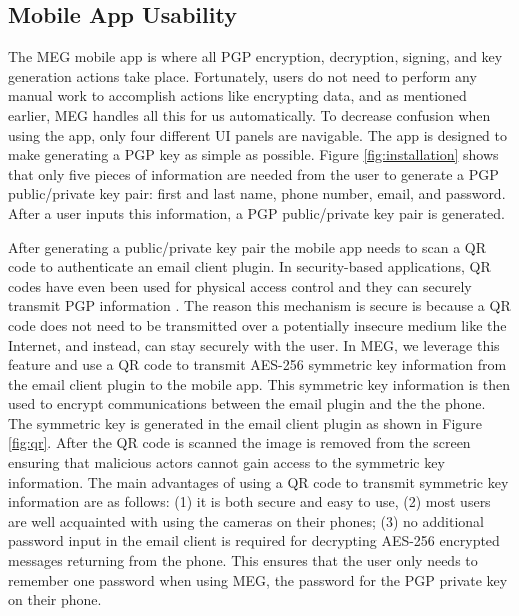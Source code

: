 \documentclass{sig-alternate-05-2015}
\begin{document}
\subsection{Mobile App Usability}
\par The MEG mobile app is where all PGP encryption, decryption, signing, and key generation actions take place. Fortunately, users do not need to perform any manual work to accomplish actions like encrypting data, and as mentioned earlier, MEG handles all this for us automatically. To decrease confusion when using the app, only four different UI panels are navigable. The app is designed to make generating a PGP key as simple as possible. Figure \ref{fig:installation} shows that only five pieces of information are needed from the user to generate a PGP public/private key pair: first and last name, phone number, email, and password. After a user inputs this information, a PGP public/private key pair is generated.
\par After generating a public/private key pair the mobile app needs to scan a QR code to authenticate an email client plugin. In security-based applications, QR codes have even been used for physical access control and they can securely transmit PGP information \cite{qrcode-authentication,qrcode-key-distribution}. The reason this mechanism is secure is because a QR code does not need to be transmitted over a potentially insecure medium like the Internet, and instead, can stay securely with the user. In MEG, we leverage this feature and use a QR code to transmit AES-256 symmetric key information from the email client plugin to the mobile app. This symmetric key information is then used to encrypt communications between the email plugin and the the phone. The symmetric key is generated in the email client plugin as shown in Figure \ref{fig:qr}. After the QR code is scanned the image is removed from the screen ensuring that malicious actors cannot gain access to the symmetric key information. The main advantages of using a QR code to transmit symmetric key information are as follows: (1) it is both secure and easy to use, (2) most users are well acquainted with using the cameras on their phones; (3) no additional password input in the email client is required for decrypting AES-256 encrypted messages returning from the phone. This ensures that the user only needs to remember one password when using MEG, the password for the PGP private key on their phone.
\end{document}
